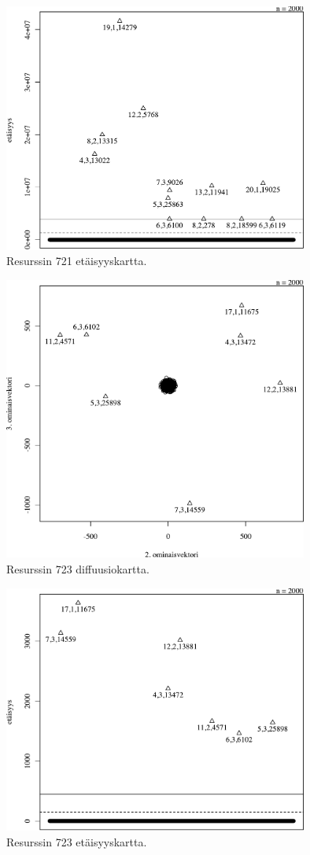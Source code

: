 \begin{figure}[p]
\centering
\includegraphics[width=10cm]{pics/tiheyskuvat/service_721.pdf}
\caption{Resurssin 721 etäisyyskartta.}
\label{service_721}
\end{figure}

\begin{figure}[p]
\centering
\includegraphics[width=10cm]{pics/diffuusiokuvat/service_723.pdf}
\caption{Resurssin 723 diffuusiokartta.}
\label{diffusio_723}
\end{figure}

\begin{figure}[p]
\centering
\includegraphics[width=10cm]{pics/tiheyskuvat/service_723.pdf}
\caption{Resurssin 723 etäisyyskartta.}
\label{service_723}
\end{figure}

